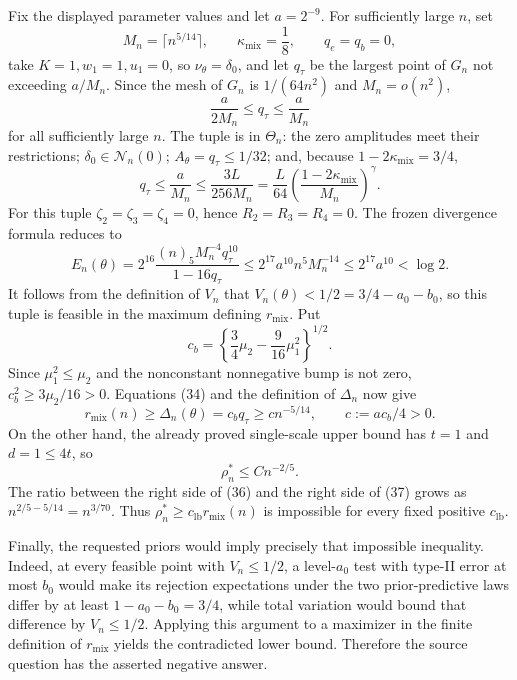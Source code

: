 Fix the displayed parameter values and let \(a=2^{-9}\). For sufficiently large \(n\), set
\[
 M_n=\lceil n^{5/14}\rceil,
 \qquad \kappa_{\mathrm{mix}}=\frac18,
 \qquad q_e=q_b=0,
\]
take \(K=1,w_1=1,u_1=0\), so \(\nu_\theta=\delta_0\), and let \(q_\tau\) be the largest point of \(G_n\) not exceeding \(a/M_n\). Since the mesh of \(G_n\) is \(1/(64n^2)\) and \(M_n=o(n^2)\),
\[
 \frac{a}{2M_n}\le q_\tau\le\frac{a}{M_n}                            \tag{34}
\]
for all sufficiently large \(n\). The tuple is in \(\Theta_n\): the zero amplitudes meet their restrictions; \(\delta_0\in\mathcal N_n(0)\); \(A_\theta=q_\tau\le1/32\); and, because \(1-2\kappa_{\mathrm{mix}}=3/4\),
\[
 q_\tau\le\frac{a}{M_n}
 \le\frac{3L}{256M_n}
 =\frac{L}{64}\left(\frac{1-2\kappa_{\mathrm{mix}}}{M_n}\right)^\gamma.
\]
For this tuple \(\zeta_2=\zeta_3=\zeta_4=0\), hence \(R_2=R_3=R_4=0\). The frozen divergence formula reduces to
\[
 E_n(\theta)
 =2^{16}\frac{(n)_5M_n^{-4}q_\tau^{10}}{1-16q_\tau}
 \le2^{17}a^{10}n^5M_n^{-14}
 \le2^{17}a^{10}<\log2.                                              \tag{35}
\]
It follows from the definition of \(V_n\) that \(V_n(\theta)<1/2=3/4-a_0-b_0\), so this tuple is feasible in the maximum defining \(r_{\mathrm{mix}}\). Put
\[
 c_b=\left\{\frac34\mu_2-\frac9{16}\mu_1^2\right\}^{1/2}.
\]
Since \(\mu_1^2\le\mu_2\) and the nonconstant nonnegative bump is not zero, \(c_b^2\ge3\mu_2/16>0\). Equations (34) and the definition of \(\Delta_n\) now give
\[
 r_{\mathrm{mix}}(n)\ge\Delta_n(\theta)=c_bq_\tau
 \ge c n^{-5/14},\qquad c:=ac_b/4>0.                                 \tag{36}
\]
On the other hand, the already proved single-scale upper bound has \(t=1\) and \(d=1\le4t\), so
\[
 \rho_n^*\le Cn^{-2/5}.                                               \tag{37}
\]
The ratio between the right side of (36) and the right side of (37) grows as \(n^{2/5-5/14}=n^{3/70}\). Thus \(\rho_n^*\ge c_{\mathrm{lb}}r_{\mathrm{mix}}(n)\) is impossible for every fixed positive \(c_{\mathrm{lb}}\).

Finally, the requested priors would imply precisely that impossible inequality. Indeed, at every feasible point with \(V_n\le1/2\), a level-\(a_0\) test with type-II error at most \(b_0\) would make its rejection expectations under the two prior-predictive laws differ by at least \(1-a_0-b_0=3/4\), while total variation would bound that difference by \(V_n\le1/2\). Applying this argument to a maximizer in the finite definition of \(r_{\mathrm{mix}}\) yields the contradicted lower bound. Therefore the source question has the asserted negative answer.

